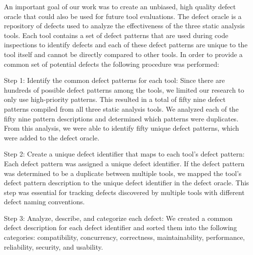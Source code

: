 \documentclass{sig-alternate}
\newcommand{\todo}[1]{\textcolor{cyan}{\textbf{[#1]}}}
\begin{document}
An important goal of our work was to create an unbiased, high quality defect oracle that could also be used for future tool evaluations. The defect oracle is a repository of defects used to analyze the effectiveness of the three static analysis tools. Each tool contains a set of defect patterns that are used during code inspections to identify defects and each of these defect patterns are unique to the tool itself and cannot be directly compared to other tools. In order to provide a common set of potential defects the following procedure was performed:

Step 1: Identify the common defect patterns for each tool:
Since there are hundreds of possible defect patterns among the tools, we limited our research to only use high-priority patterns. This resulted in a total of fifty nine defect patterns compiled from all three static analysis tools. We analyzed each of the fifty nine pattern descriptions and determined which patterns were duplicates. From this analysis, we were able to identify fifty unique defect patterns, which were added to the defect oracle.

Step 2: Create a unique defect identifier that maps to each tool's defect pattern:
Each defect pattern was assigned a unique defect identifier. If the defect pattern was determined to be a duplicate between multiple tools, we mapped the tool's defect pattern description to the unique defect identifier in the defect oracle. This step was essential for tracking defects discovered by multiple tools with different defect naming conventions.

Step 3: Analyze, describe, and categorize each defect:
We created a common defect description for each defect identifier and sorted them into the following categories: compatibility, concurrency, correctness, maintainability, performance, reliability, security, and usability. %
\end{document}
